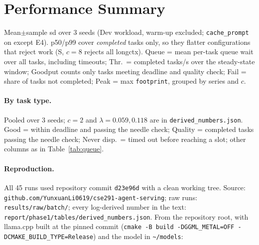 \documentclass{article}
\begin{document}
\section{Performance Summary}
\label{app:perf}
Mean$\pm$sample sd over 3 seeds (Dev workload, warm-up excluded; \texttt{cache\_prompt} on except E4). p50/p99 cover \emph{completed} tasks only, so they flatter configurations that reject work (S, $c{=}8$ rejects all longctx). Queue = mean per-task queue wait over all tasks, including timeouts; Thr.\ = completed tasks/s over the steady-state window; Goodput counts only tasks meeting deadline and quality check; Fail = share of tasks not completed; Peak = max \texttt{footprint}, grouped by series and $c$.

\begin{center}
\footnotesize

\end{center}

\paragraph{By task type.} Pooled over 3 seeds; $c{=}2$ and $\lambda{=}0.059, 0.118$ are in \texttt{derived\_numbers.json}. Good = within deadline and passing the needle check; Quality = completed tasks passing the needle check; Never disp.\ = timed out before reaching a slot; other columns as in Table~\ref{tab:queue}.

\begin{center}
\scriptsize
\setlength{\tabcolsep}{5pt}
\renewcommand{\arraystretch}{0.92}

\end{center}

\paragraph{Reproduction.} All 45 runs used repository commit \texttt{d23e96d} with a clean working tree. Source: \texttt{github.com/YunxuanLi0619/cse291-agent-serving}; raw runs: \texttt{results/raw/batch/}; every log-derived number in the text: \texttt{report/phase1/tables/derived\_numbers.json}. From the repository root, with llama.cpp built at the pinned commit (\texttt{cmake -B build -DGGML\_METAL=OFF -DCMAKE\_BUILD\_TYPE=Release}) and the model in \texttt{\textasciitilde/models}:
\end{document}
